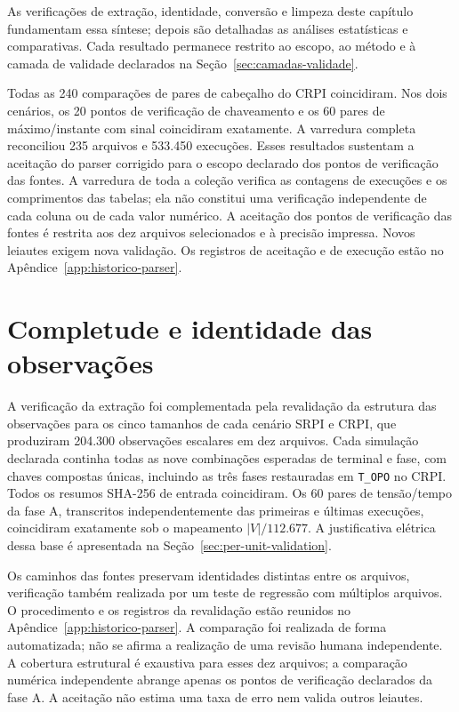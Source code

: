 \documentclass[
	12pt,				%
	openright,			%
	oneside,			%
	a4paper,			%
	chapter=TITLE,		%
	section=TITLE,		%
	subsection=TITLE,	%
	subsubsection=TITLE,%
	english,			%
	brazilian			%
	]{abntex2}
\theoremstyle{definition}
\begin{document}
As verificações de extração, identidade, conversão e limpeza deste capítulo
fundamentam essa síntese; depois são detalhadas as análises estatísticas e
comparativas. Cada resultado permanece restrito ao escopo, ao método e à
camada de validade declarados na Seção~\ref{sec:camadas-validade}.


Todas as 240 comparações de pares de cabeçalho do CRPI coincidiram. Nos dois
cenários, os 20 pontos de verificação de chaveamento e os 60 pares de
máximo/instante com sinal coincidiram exatamente. A varredura completa
reconciliou 235 arquivos e 533.450 execuções. Esses
resultados sustentam a aceitação do parser corrigido para o escopo declarado
dos pontos de verificação das fontes. A varredura de toda a coleção verifica as contagens
de execuções e os comprimentos das tabelas; ela não constitui uma verificação
independente de cada coluna ou de cada valor numérico. A aceitação dos pontos
de verificação das fontes é restrita aos dez arquivos selecionados e à
precisão impressa. Novos leiautes exigem nova validação. Os registros de
aceitação e de execução estão no Apêndice~\ref{app:historico-parser}.

\section{Completude e identidade das observações}

A verificação da extração foi complementada pela revalidação da estrutura
das observações para os cinco tamanhos de cada
cenário SRPI e CRPI, que
produziram 204.300 observações escalares em dez arquivos. Cada simulação
declarada continha todas as nove combinações esperadas de terminal e fase, com
chaves compostas únicas, incluindo as três fases restauradas em
\texttt{T\_OPO} no CRPI. Todos os resumos SHA-256 de entrada coincidiram. Os 60 pares
de tensão/tempo da fase A, transcritos independentemente das primeiras e
últimas execuções, coincidiram exatamente sob o mapeamento $|V|/112.677$.
A justificativa elétrica dessa base é apresentada na
Seção~\ref{sec:per-unit-validation}.

Os caminhos das fontes preservam identidades distintas entre os arquivos,
verificação também realizada por um teste de regressão com múltiplos arquivos.
O procedimento e os registros da revalidação estão reunidos no
Apêndice~\ref{app:historico-parser}.
A comparação foi realizada de forma automatizada; não se afirma a realização
de uma revisão humana independente.
A cobertura estrutural é exaustiva para esses dez arquivos; a comparação
numérica independente abrange apenas os pontos de verificação declarados da
fase A. A aceitação não estima uma taxa de erro nem valida outros leiautes.
\end{document}
